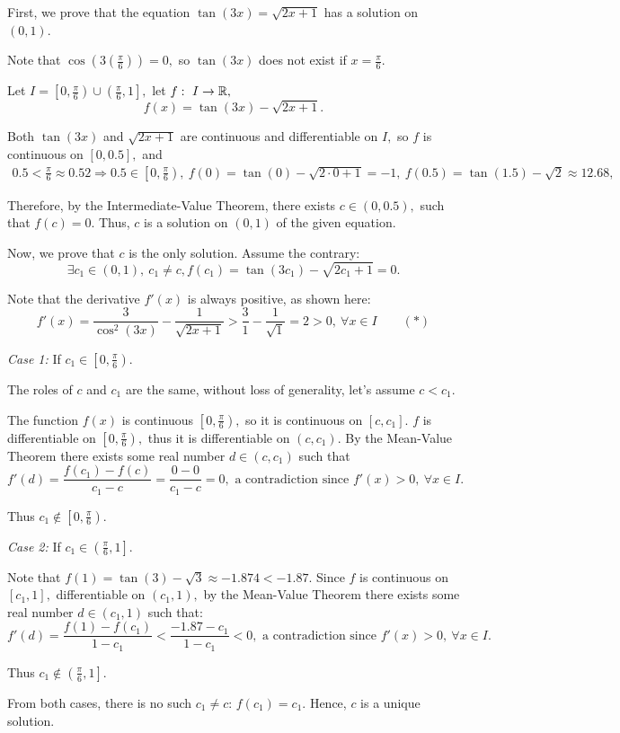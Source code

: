\documentclass{article}
\begin{document}
\begin{soln}
    First, we prove that the equation $\tan(3x) = \sqrt{2x + 1}$ has a solution on $(0, 1).$
    
    Note that $\cos(3(\frac{\pi}{6})) = 0,$ so $\tan(3x)$ does not exist if $x = \frac{\pi}{6}.$

    Let $I = \left[0, \frac{\pi}{6} \right) \cup \left(\frac{\pi}{6}, 1\right],$
    let $f:\ I \rightarrow \mathbb R,$
    \[
        f(x) = \tan(3x) - \sqrt{2x + 1}.
    \]

    Both $\tan(3x)$ and $\sqrt{2x + 1}$ are continuous and differentiable on $I,$ so $f$ is continuous on $[0, 0.5],$ and
    \[
        \begin{aligned}
            0.5 < \frac{\pi}{6} \approx 0.52 \Rightarrow 0.5 \in \left[0, \frac{\pi}{6} \right),\ f(0) = \tan(0)- \sqrt{2\cdot 0 + 1} = -1,\ f(0.5) = \tan(1.5) - \sqrt{2} \approx 12.68,
        \end{aligned}
    \]

    Therefore, by the Intermediate-Value Theorem, there exists $c \in (0, 0.5),$ such that $f(c) = 0.$ Thus, $c$ is a solution on $(0,1)$ of the given equation.

    Now, we prove that $c$ is the only solution.
    Assume the contrary: 
    \[ 
        \exists c_1 \in (0, 1),\ c_1 \ne c, f(c_1) = \tan(3c_1) - \sqrt{2c_1 + 1} = 0.
    \]

    Note that the derivative $f'(x)$ is always positive, as shown here:
    \[
        f'(x) = \dfrac{3}{\cos^2(3x)} - \dfrac{1}{\sqrt{2x + 1}} > \frac{3}{1} - \frac{1}{\sqrt{1}} = 2 > 0,\ \forall x \in I \qquad (*)
    \]

    \textit{Case 1:} If $c_1 \in \left[0,  \frac{\pi}{6} \right).$ 

    The roles of $c$ and $c_1$ are the same, without loss of generality, let's assume $c < c_1.$
    
    The function $f(x)$ is continuous $\left[0,  \frac{\pi}{6} \right),$ so it is continuous on $[c, c_1].$
    $f$ is differentiable on $\left[0,  \frac{\pi}{6} \right),$ thus it is differentiable on $(c, c_1).$
    By the Mean-Value Theorem there exists some real number $d \in (c,c_1)$ such that 
    \[
        f'(d) = \frac{f(c_1) - f(c)}{c_1 - c} = \frac{0-0}{c_1 - c} = 0, \text{\ a contradiction since } f'(x) > 0,\ \forall x \in I.
    \]
    
    Thus $c_1 \not \in \left[0,  \frac{\pi}{6} \right).$

    \textit{Case 2:} If $c_1 \in \left(\frac{\pi}{6}, 1 \right].$ 

    Note that $f(1) = \tan(3) - \sqrt{3} \approx -1.874 < -1.87.$
    Since $f$ is continuous on $[c_1, 1],$ differentiable on $(c_1, 1),$ by the Mean-Value Theorem there exists some real number $d \in (c_1, 1)$ such that:
    \[
        f'(d) = \frac{f(1) - f(c_1)}{1 - c_1} < \frac{-1.87 - c_1}{1-c_1} < 0, \text{\ a contradiction since } f'(x) > 0,\ \forall x \in I.
    \]

    Thus $c_1 \not \in \left(\frac{\pi}{6}, 1 \right].$
    
    From both cases, there is no such $c_1 \ne c$: $f(c_1) = c_1.$
    Hence, $c$ is a unique solution.
\end{soln}
\end{document}
